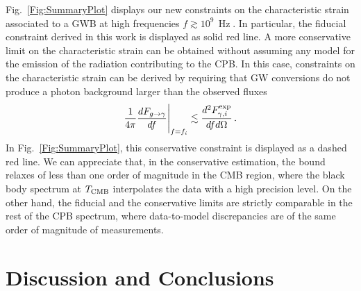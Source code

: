 \documentclass[twocolumn,superscriptaddress,floatfix,preprintnumbers, nofootinbib,hyperref]{revtex4-2}
\DeclareMathOperator{\Hz}{Hz}
\begin{document}
Fig.~\ref{Fig:SummaryPlot} displays our new constraints on the characteristic strain associated to a GWB at high frequencies $f\gtrsim10^{9}\,\Hz$. In particular, the fiducial constraint derived in this work is displayed as solid red line. 
A more conservative limit on the characteristic strain can be obtained without assuming any model for the emission of the radiation contributing to the CPB. In this case, constraints on the characteristic strain can be derived by requiring that GW conversions do not produce a photon background larger than the observed fluxes 
\begin{equation}
    \frac{1}{4\pi}\frac{dF_{g \rightarrow \gamma}}{df}\Bigg{|}_{f=f_i}\lesssim\frac{d^2F_{\gamma,i}^{\rm exp}}{dfd\Omega}\,.
\end{equation}
In Fig.~\ref{Fig:SummaryPlot}, this conservative constraint is displayed as a dashed red line. We can appreciate that, in the conservative estimation, the bound relaxes of less than one order of magnitude in the CMB region, where the black body spectrum at $T_{\rm CMB}$ interpolates the data with a high precision level. On the other hand, the fiducial and the conservative limits are strictly comparable in the rest of the CPB spectrum, where data-to-model discrepancies are of the same order of magnitude of measurements.





\section{Discussion and Conclusions}
\label{sec:Discussion}
\end{document}
